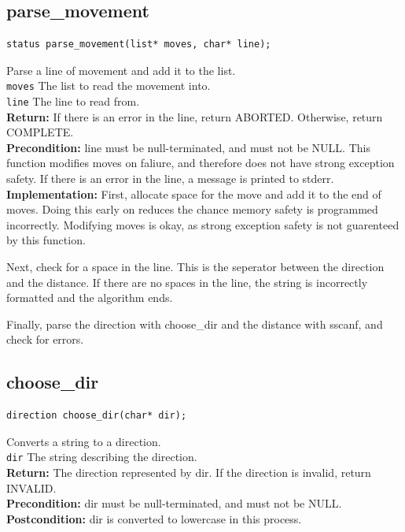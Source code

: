\documentclass{article}
\begin{document}
\subsection{parse\_movement}
\begin{lstlisting}
status parse_movement(list* moves, char* line);
\end{lstlisting}


  Parse a line of movement and add it to the list.\\ 
 \texttt{moves} The list to read the movement into.\\ 
 \texttt{line} The line to read from.\\ 
 \textbf{Return:} If there is an error in the line, return ABORTED.
     Otherwise, return COMPLETE.\\ 
 \textbf{Precondition:}  line must be null-terminated, and must not be NULL.
  This function modifies  moves on faliure, and therefore
     does not have strong exception safety. If there is an error
     in the line, a message is printed to stderr.\\ 
 
 
 \textbf{Implementation:}
First, allocate space for the move and add it to the end of  moves.
Doing this early on reduces the chance memory safety is programmed incorrectly.
Modifying  moves is okay, as strong exception safety is not guarenteed by this function.

Next, check for a space in the line.
This is the seperator between the direction and the distance.
If there are no spaces in the line, the string is incorrectly formatted and the algorithm ends.

Finally, parse the direction with  choose\_dir
 and the distance with  sscanf, and check for errors.
 

\subsection{choose\_dir}
\begin{lstlisting}
direction choose_dir(char* dir);
\end{lstlisting}


  Converts a string to a  direction.\\ 
 \texttt{dir} The string describing the direction.\\ 
 \textbf{Return:} The direction represented by  dir. If the direction is invalid,
     return INVALID.\\ 
 \textbf{Precondition:}  dir must be null-terminated, and must not be NULL.\\ 
 \textbf{Postcondition:}  dir is converted to lowercase in this process.\\ 
 
\end{document}

